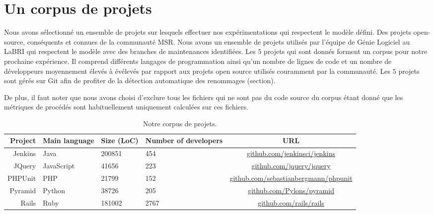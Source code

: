 \section{Un corpus de projets}
\label{sec:ensemble_projet}
Nous avons sélectionné un ensemble de projets sur lesquels effectuer nos expérimentations qui respectent le modèle défini. Des projets open-source, conséquents et connues de la communauté MSR. Nous avons un ensemble de projets utilisés par l'équipe de Génie Logiciel au LaBRI qui respectent le modèle avec des branches de maintenances identifiées. Les $5$ projets qui sont donnés  forment un corpus pour notre prochaine expérience. Il comprend différents langages de programmation ainsi qu'un nombre de lignes de code et un nombre de développeurs moyennement élevés à évélevés par rapport aux projets open source utilisés couramment par la communauté. Les $5$ projets sont gérés sur Git afin de profiter de la détection automatique des renommages (section). 

De plus, il faut noter que nous avons choisi d'exclure tous les fichiers qui ne sont pas du code source du corpus étant donné que les métriques de procédés sont habituellement uniquement calculées sur ces fichiers. \\

\begin{table*}[h]
\centering
\small
\begin{tabular}{rllp{1.7cm}c}
\toprule
Project & Main language & Size (LoC) & Number of developers & URL\\
\midrule
Jenkins & Java & 200851 & 454 & \url{github.com/jenkinsci/jenkins} \\
JQuery & JavaScript & 41656 & 223 & \url{github.com/jquery/jquery} \\
PHPUnit & PHP & 21799 & 152 & \url{github.com/sebastianbergmann/phpunit}\\
Pyramid & Python & 38726 & 205 & \url{github.com/Pylons/pyramid} \\
Rails & Ruby & 181002 & 2767 & \url{github.com/rails/rails}\\
\bottomrule
\end{tabular}
\caption{Notre corpus de projets.}
\label{tab:projects}
\end{table*}
